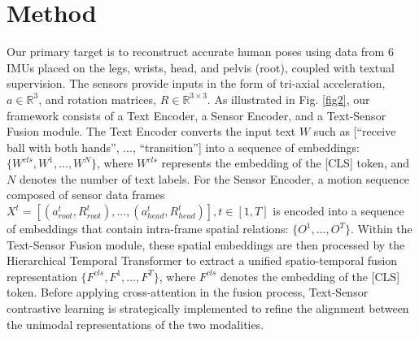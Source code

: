 \documentclass[letterpaper]{article} %
\begin{document}
\section{Method}
Our primary target is to reconstruct accurate human poses using data from 6 IMUs placed on the legs, wrists, head, and pelvis (root), coupled with textual supervision. The sensors provide inputs in the form of tri-axial acceleration, $a \in \mathbb{R}^{3}$, and rotation matrices, $R \in \mathbb{R}^{3\times3}$.
As illustrated in Fig. \ref{fig2}, our framework consists of a Text Encoder, a Sensor Encoder, and a Text-Sensor Fusion module. 
The Text Encoder converts the input text $W$ such as [“receive ball with both hands”, ..., “transition”] into a sequence of embeddings: $\{W^{cls}, W^{1}, ..., W^{N}\}$, where $W^{cls}$ represents the embedding of the [CLS] token, and $N$ denotes the number of text labels. 
For the Sensor Encoder, 
a motion sequence composed of sensor data frames 
$X^{t}=[(a_{root}^t,R_{root}^t),..., (a_{head}^t,R_{head}^t)], t \in [1,T]$ 
is encoded into a sequence of embeddings that contain intra-frame spatial relations: $\{O^{1}, ..., O^{T} \}$. 
Within the Text-Sensor Fusion module, these spatial embeddings are then processed by the Hierarchical Temporal Transformer to extract a unified spatio-temporal fusion representation $\{{F^{cls}, F^{1}, ..., F^{T}}\}$, where $F^{cls}$ denotes the embedding of the [CLS] token.
Before applying cross-attention in the fusion process, Text-Sensor contrastive learning is strategically implemented to refine the alignment between the unimodal representations of the two modalities.
\end{document}

